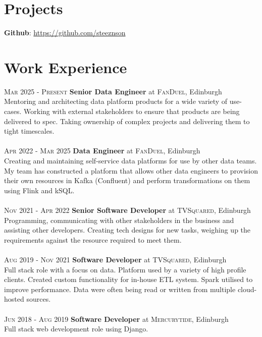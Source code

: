 \documentclass[14pt, a4paper]{extarticle}
\begin{document}
\begin{multicols}{2}
\section{Projects}
\noindent\textbf{Github}: \url{https://github.com/steeznson}

\columnbreak
\section{Work Experience}
\noindent\textsc{Mar 2025 - Present} \textbf{Senior Data Engineer}
at \textsc{FanDuel}, Edinburgh\\
Mentoring and architecting data platform products for a wide variety of use-cases. Working with external stakeholders to ensure that products are being delivered to spec. Taking ownership of complex projects and delivering them to  tight timescales.\\
\\
\noindent\textsc{Apr 2022 - Mar 2025} \textbf{Data Engineer}
at \textsc{FanDuel}, Edinburgh\\
Creating and maintaining self-service data platforms for use by other data teams. My team has constructed a platform that allows other data engineers to provision their own resources in Kafka (Confluent) and perform transformations on them using Flink and kSQL.\\
\\
\noindent\textsc{Nov 2021 - Apr 2022} \textbf{Senior Software Developer}
at \textsc{TVSquared}, Edinburgh\\
Programming, communicating with other stakeholders in the business and assisting other developers. Creating tech designs for new tasks, weighing up the requirements against the resource required to meet them.\\
\\
\noindent\textsc{Aug 2019 - Nov 2021} \textbf{Software Developer}
at \textsc{TVSquared}, Edinburgh\\
Full stack role with a focus on data. Platform used by a variety of high profile clients. Created custom functionality for in-house ETL system. Spark utilised to improve performance. Data were often being read or written from multiple cloud-hosted sources.\\
\\
\noindent\textsc{Jun 2018 - Aug 2019} \textbf{Software Developer}
at \textsc{Mercurytide}, Edinburgh\\
Full stack web development role using Django.\\
\end{multicols}
\end{document}
